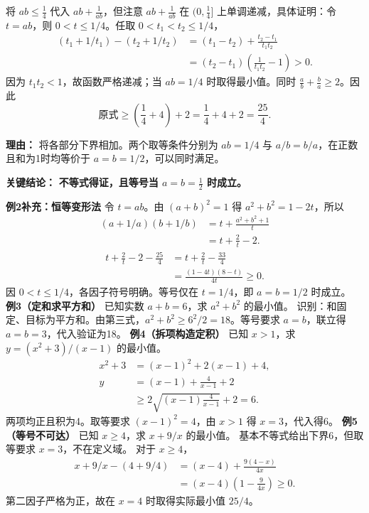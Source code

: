 \begin{examplebox}
\begin{description}[style=nextline, leftmargin=2.8em, labelsep=0.5em, itemsep=0.45em]
    \item[\textbf{第三步（代入求下界）：}] 将 $ab \le \frac{1}{4}$ 代入 $ab + \frac{1}{ab}$，但注意 $ab + \frac{1}{ab}$ 在 $(0, \frac{1}{4}]$ 上单调递减，具体证明：令 $t=ab$，则 $0<t\le1/4$。任取 $0<t_1<t_2\le1/4$，
\begin{align*}(t_1+1/t_1)-(t_2+1/t_2)&=(t_1-t_2)+\frac{t_2-t_1}{t_1t_2}\\&=(t_2-t_1)\left(\frac1{t_1t_2}-1\right)>0.\end{align*}
因为 $t_1t_2<1$，故函数严格递减；当 $ab=1/4$ 时取得最小值。同时 $\frac{a}{b}+\frac{b}{a} \ge 2$。因此
    \[
    \text{原式} \ge \left(\frac{1}{4} + 4\right) + 2 = \frac{1}{4} + 4 + 2 = \frac{25}{4}.
    \]
    \par\textbf{理由：} 将各部分下界相加。两个取等条件分别为 $ab=1/4$ 与 $a/b=b/a$，在正数且和为1时均等价于 $a=b=1/2$，可以同时满足。
\end{description}

\textbf{\textcolor{CExample}{关键结论：}} \textbf{不等式得证，且等号当 $a=b=\frac{1}{2}$ 时成立。}

\medskip\textbf{例2补充：恒等变形法}
令 $t=ab$。由 $(a+b)^2=1$ 得 $a^2+b^2=1-2t$，所以
\begin{align*}(a+1/a)(b+1/b)&=t+\frac{a^2+b^2+1}{t}\\&=t+\frac2t-2.\end{align*}
\begin{align*}t+\frac2t-2-\frac{25}{4}&=t+\frac2t-\frac{33}{4}\\&=\frac{(1-4t)(8-t)}{4t}\ge0.\end{align*}
因 $0<t\le1/4$，各因子符号明确。等号仅在 $t=1/4$，即 $a=b=1/2$ 时成立。
\medskip\textbf{例3（定和求平方和）} 已知实数 $a+b=6$，求 $a^2+b^2$ 的最小值。
识别：和固定、目标为平方和。由第三式，$a^2+b^2\ge6^2/2=18$。等号要求 $a=b$，联立得 $a=b=3$，代入验证为18。
\medskip\textbf{例4（拆项构造定积）} 已知 $x>1$，求 $y=(x^2+3)/(x-1)$ 的最小值。
\begin{align*}x^2+3&=(x-1)^2+2(x-1)+4,\\y&=(x-1)+\frac4{x-1}+2\\&\ge2\sqrt{(x-1)\frac4{x-1}}+2=6.\end{align*}
两项均正且积为4。取等要求 $(x-1)^2=4$，由 $x>1$ 得 $x=3$，代入得6。
\medskip\textbf{例5（等号不可达）} 已知 $x\ge4$，求 $x+9/x$ 的最小值。
基本不等式给出下界6，但取等要求 $x=3$，不在定义域。
对于 $x\ge4$，
\begin{align*}x+9/x-(4+9/4)&=(x-4)+\frac{9(4-x)}{4x}\\&=(x-4)\left(1-\frac9{4x}\right)\ge0.\end{align*}
第二因子严格为正，故在 $x=4$ 时取得实际最小值 $25/4$。

\end{examplebox}
